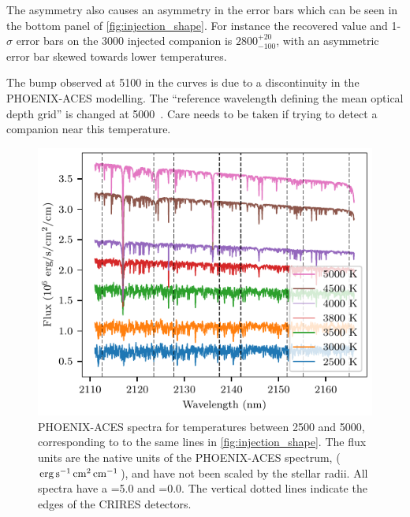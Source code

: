 The asymmetry also causes an asymmetry in the \textchisquared{} error bars which can be seen in the bottom panel of \cref{fig:injection_shape}.
For instance the recovered value and 1-\(\sigma\) error bars on the 3000\K{} injected companion is \(2800 ^{+20}_{-100}\), with an asymmetric error bar skewed towards lower temperatures.

The bump observed at 5100\K{} in the \textchisquared{} curves is due to a discontinuity in the {PHOENIX-ACES} modelling.
The ``reference wavelength defining the mean optical depth grid'' is changed at 5000\K{}~\citep[][Section~2.3]{husser_new_2013}.
Care needs to be taken if trying to detect a companion near this temperature.

\begin{figure}
    \centering
    \includegraphics[width=\hsize]{./figures/companion_recovery/companion_spectra.pdf}
    \caption{{PHOENIX-ACES} spectra for temperatures between 2500 and 5000\K{}, corresponding to to the same lines in \cref{fig:injection_shape}.
The flux units are the native units of the {PHOENIX-ACES} spectrum, (\(\rm erg\,s^{-1}\,cm^{2}\,cm^{-1}\)), and have not been scaled by the stellar radii.
All spectra have a \Logg{}=5.0 and \feh{}=0.0.
The vertical dotted lines indicate the edges of the CRIRES detectors.}
    \label{fig:comp_spectra}
\end{figure}


